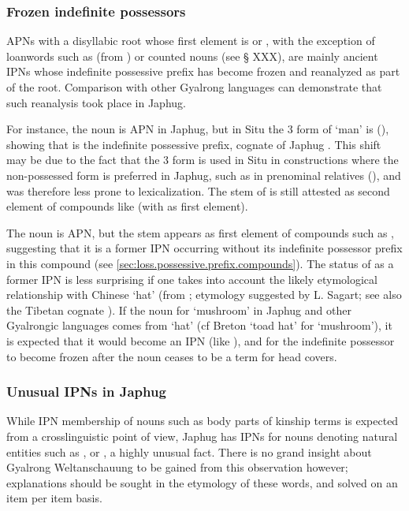 \subsubsection{Frozen indefinite possessors} \label{sec:frozen.indef}
APNs with a disyllabic root whose first element is  or , with the exception of loanwords such as  (from ) or counted nouns (see § XXX), are mainly ancient IPNs whose indefinite possessive prefix  has become frozen and reanalyzed as part of the root. Comparison with other Gyalrong languages can demonstrate that such reanalysis took place in Japhug.

For instance, the noun  is APN in Japhug, but in Situ the 3\sg{} form of  `man' is   (\citealt[183;197]{lin09phd}), showing that  is the indefinite possessive prefix, cognate of Japhug . This shift may be due to the fact that the 3\sg{} form is used in Situ in constructions where the non-possessed form is preferred in Japhug, such as in prenominal relatives (\citealt[190]{lin09phd}), and was therefore less prone to lexicalization. The stem  of   is still attested as second element of compounds like  (with  as first element).  

The noun  is APN, but the stem  appears as first element of compounds such as , suggesting that it is a former IPN occurring without its indefinite possessor prefix in this compound (see \ref{sec:loss.possessive.prefix.compounds}). The status of  as a former IPN is less surprising if one takes into account the likely etymological relationship with Chinese   `hat' (from ; etymology suggested by L. Sagart; see also the Tibetan cognate ).  If the noun for `mushroom' in Japhug and other Gyalrongic languages comes from `hat' (cf Breton  `toad hat' for `mushroom'), it is expected that it would become an IPN (like ), and for the indefinite possessor  to become frozen after the noun ceases to be a term for head covers.
 
\subsubsection{Unusual IPNs in Japhug} \label{sec:earth.IPN}
While IPN membership of nouns such as body parts of kinship terms is expected from a crosslinguistic point of view, Japhug has IPNs for nouns denoting natural entities such as ,  or , a highly unusual fact. There is no grand insight about Gyalrong Weltanschauung to be gained from this observation however; explanations should be sought in the etymology of these words, and solved on an item per item basis.  

